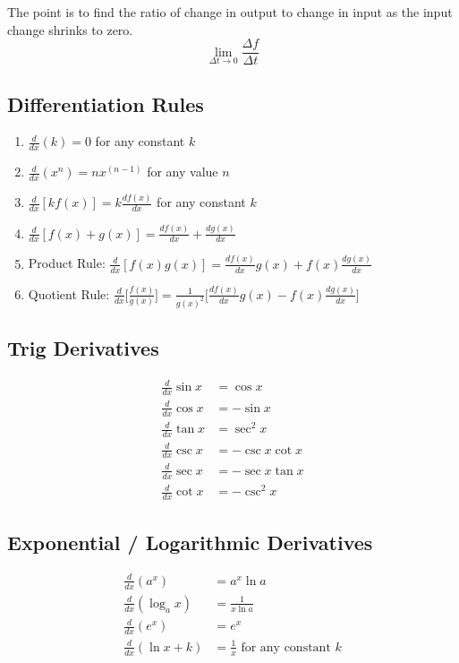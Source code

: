 \documentclass[12pt]{article}
\begin{document}
The point is to find the ratio of change in output to change in input as the input change shrinks to zero. \[ \lim_{\Delta t\to 0} \frac{\Delta f}{\Delta t} \]

\subsection*{Differentiation Rules}
\begin{enumerate}
\item $\frac{d}{dx}(k) = 0$ for any constant $k$
\item $\frac{d}{dx}(x^n) = nx^{(n-1)}$ for any value $n$
\item $\frac{d}{dx}[kf(x)] = k\frac{df(x)}{dx}$ for any constant $k$
\item $\frac{d}{dx}[f(x)+g(x)] = \frac{df(x)}{dx} + \frac{dg(x)}{dx}$
\item Product Rule: $\frac{d}{dx}[f(x)g(x)] = \frac{df(x)}{dx}g(x) + f(x)\frac{dg(x)}{dx}$
\item Quotient Rule: $\frac{d}{dx}\big[\frac{f(x)}{g(x)}\big] = \frac{1}{g(x)^2}\big[\frac{df(x)}{dx}g(x) - f(x)\frac{dg(x)}{dx}\big]$
\end{enumerate}

\subsection*{Trig Derivatives}
\begin{align*}
\frac{d}{dx}\sin x &= \cos x\\
\frac{d}{dx}\cos x &= -\sin x\\
\frac{d}{dx}\tan x &= \sec^2 x\\
\frac{d}{dx}\csc x &= -\csc x\cot x\\
\frac{d}{dx}\sec x &= -\sec x\tan x\\
\frac{d}{dx}\cot x &= -\csc^2 x
\end{align*}

\subsection*{Exponential / Logarithmic Derivatives}
\begin{align*}
\frac{d}{dx}(a^x) &= a^x\ln{a}\\
\frac{d}{dx}(\log_a x) &= \frac{1}{x\ln{a}}\\
\frac{d}{dx}(e^x) &= e^x\\
\frac{d}{dx}(\ln{x+k}) &= \frac{1}{x} \text{ for any constant } k
\end{align*}
\end{document}
